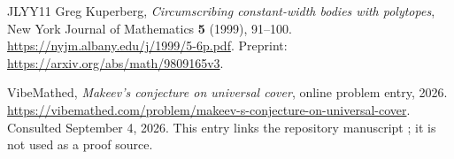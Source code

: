 \documentclass[11pt,reqno]{amsart}
\theoremstyle{definition}
\theoremstyle{remark}
\numberwithin{equation}{section}
\begin{document}
\begin{thebibliography}{JLYY11}
Greg Kuperberg,
\emph{Circumscribing constant-width bodies with polytopes},
New York Journal of Mathematics \textbf{5} (1999), 91--100.
\url{https://nyjm.albany.edu/j/1999/5-6p.pdf}.
Preprint: \url{https://arxiv.org/abs/math/9809165v3}.

VibeMathed,
\emph{Makeev's conjecture on universal cover}, online problem entry,
2026. \url{https://vibemathed.com/problem/makeev-s-conjecture-on-universal-cover}.
Consulted September 4, 2026. This entry links the repository
manuscript \cite{ChatGPT2026}; it is not used as a proof source.

\end{thebibliography}
\end{document}
